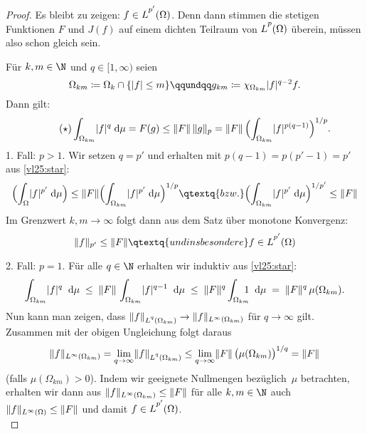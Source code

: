 \begin{proof}
    Es bleibt zu zeigen: $f\in\Lpp[p'](\Omega)$. Denn dann stimmen die stetigen
    Funktionen $F$ und $J(f)$ auf einem dichten Teilraum von $\Lpp(\Omega)$
    überein, müssen also schon gleich sein.
    
    Für $k,m\in\N$ und $q\in[1,\infty)$ seien
    \[ \Omega_{km} \defeq \Omega_k \cap \{ \abs{f} \leq m \} 
        \qqundqq
        g_{km} \defeq \chi_{\Omega_{km}} \abs{f}^{q-2} f
    . \]
    Dann gilt:
    \[ \tag{$\star$} \label{vl25:star}
        \int_{\Omega_{km}} \lvert f\rvert^q \;\mathrm{d} \mu = F(g)
        \leq \lVert F\rVert \, \lVert g\rVert_p
        = \lVert F\rVert \, \Bigl( \int_{\Omega_{km}} \lvert f\rvert^{p(q-1)} 
        \Bigr)^{1/p}
    . \]
    1. Fall: $p>1$. Wir setzen $q = p'$ und erhalten mit
    $p(q-1) = p(p'-1) = p'$ aus \eqref{vl25:star}:
    \[ \Bigl( \int_\Omega \abs{f}^{p'} \dif\mu \Bigr)
        \leq \norm{F} \Bigl( \int_{\Omega_{km}} \abs{f}^{p'} \dif\mu
        \Bigr)^{1/p}
        \qtextq{bzw.}
        \Bigl( \int_{\Omega_{km}} \abs{f}^{p'} \dif\mu
        \Bigr)^{1/p'} \leq \norm{F}
    \]
    Im Grenzwert $k,m\to\infty$ folgt dann aus dem Satz über monotone
    Konvergenz:
    \[ \norm{f}_{p'} \leq \norm{F}
        \qtextq{und insbesondere}
        f \in \Lpp[p'](\Omega)
    \]
    
    2. Fall: $p=1$. Für alle $q\in\N$ erhalten wir induktiv aus
    \eqref{vl25:star}:
    \[ \thickmuskip=10mu
        \int_{\Omega_{km}} \abs{f}^q \dif\mu
        \leq \norm{F} \, \int_{\Omega_{km}} \abs{f}^{q-1} \dif\mu
        \leq \norm{F}^q \int_{\Omega_{km}} \mkern-13mu 1 \dif\mu
        = \norm{F}^q \, \mu(\Omega_{km})
    . \]
    Nun kann man zeigen, dass $\norm{f}_{\Lpp[q](\Omega_{km})} 
    \to \norm{f}_{\Lp\infty(\Omega_{km})}$ für $q\to\infty$ gilt.
    Zusammen mit der obigen Ungleichung folgt daraus
    \[ \norm{f}_{\Lp\infty(\Omega_{km})}
        = \lim_{q\to\infty} \norm{f}_{\Lpp[q](\Omega_{km})}
        \leq \lim_{q\to\infty} \norm{F} \, 
            \bigl( \mu(\Omega_{km}) \bigr)^{1/q}
        = \norm{F}
    \]
    (falls $\mu(\Omega_{km}) > 0$).
    Indem wir geeignete Nullmengen bezüglich~$\mu$ betrachten, erhalten wir dann
    aus $\lVert f\rVert_{L^{\infty}(\Omega_{km})}\leq\lVert F\rVert$ für alle $k,m\in\N$ auch
    $\lVert f\rVert_{L^{\infty}(\Omega)}\leq\lVert F\rVert$ und damit $f\in\Lpp[p'](\Omega)$.
    \\
\end{proof}
